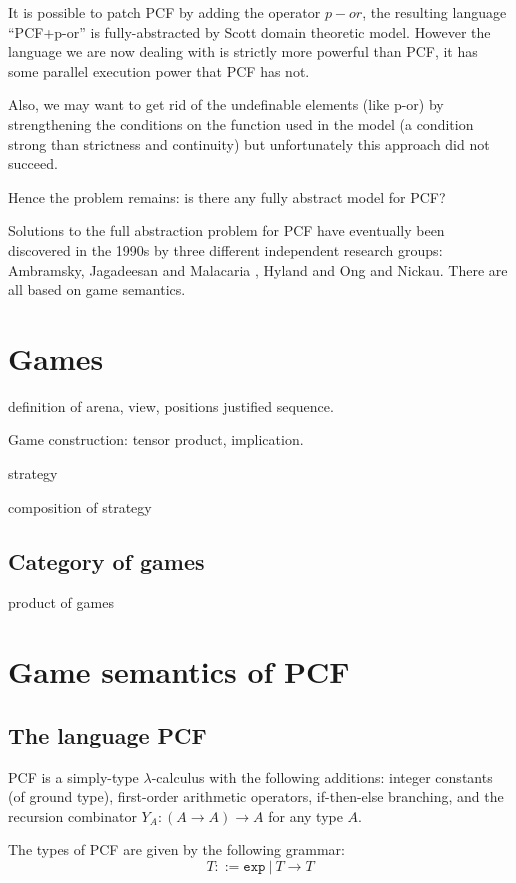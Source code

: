 It is possible to patch PCF by adding the operator $p-or$, the
resulting language ``PCF+p-or'' is fully-abstracted by Scott domain
theoretic model. However the language we are now dealing with is
strictly more powerful than PCF, it has some parallel execution
power that PCF has not.

Also, we may want to get rid of the undefinable elements (like p-or)
by strengthening the conditions on the function used in the model (a
condition strong than strictness and continuity) but unfortunately
this approach did not succeed.

Hence the problem remains: is there any fully abstract model for
PCF?

Solutions to the full abstraction problem for PCF have eventually
been discovered in the 1990s by three different independent research
groups: Ambramsky, Jagadeesan and Malacaria \cite{abramsky94full},
Hyland and Ong \cite{hylandong_pcf} and Nickau. There are all based
on game semantics.


\section{Games}

definition of arena, view, positions
justified sequence.

Game construction: tensor product, implication.

strategy

composition of strategy

\subsection{Category of games}
\label{subsec:catgames}

product of games

\section{Game semantics of PCF}
\subsection{The language PCF}
PCF is a simply-type $\lambda$-calculus with the following
additions: integer constants  (of ground type), first-order
arithmetic operators, if-then-else branching, and the recursion
combinator $Y_A : (A\rightarrow A)\rightarrow A$ for any type $A$.

The types of PCF are given by the following grammar:
$$ T ::= \texttt{exp}\ |\ T \rightarrow T$$


